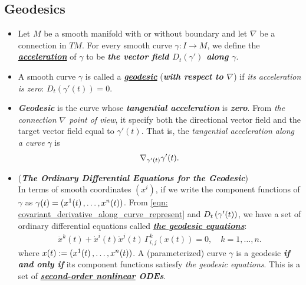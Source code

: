 \documentclass[11pt]{article}
\begin{document}
\subsection{Geodesics}
\begin{itemize}
\item 
\begin{definition}
Let $M$ be a smooth manifold with or without boundary and let $\nabla$ be a connection in $TM$. For every smooth curve $\gamma: I \rightarrow M$, we define the \underline{\emph{\textbf{acceleration}}} of $\gamma$ to be \emph{\textbf{the vector field $D_t(\gamma')$ along $\gamma$}}.
\end{definition}

\item \begin{definition}
A smooth curve $\gamma$ is called a \underline{\emph{\textbf{geodesic}}} (\emph{\textbf{with respect to $\nabla$}}) if \emph{its acceleration is zero}: $D_t(\gamma'(t)) = 0$. 
\end{definition}

\item \begin{remark}
\emph{\textbf{Geodesic}} is the curve whose \emph{\textbf{tangential acceleration}} is \emph{\textbf{zero}}. From \emph{the connection $\nabla$ point of view}, it specify both the directional vector field and the target vector field equal to $\gamma'(t)$. That is, the \emph{tangential acceleration along a curve} $\gamma$ is 
\begin{align*}
\nabla_{\gamma'(t)}{\gamma'(t)}.
\end{align*}
\end{remark}

\item \begin{remark} (\emph{\textbf{The Ordinary Differential Equations for the Geodesic}})\\
In terms of smooth coordinates $(x^i)$, if we write the component functions of $\gamma$ as $\gamma(t) = (x^1(t) \,{,}\ldots{,}\, x^n(t))$. From \eqref{eqn: covariant_derivative_along_curve_represent} and  $D_t\left(\gamma'(t)\right)$, we have a set of ordinary differential equations called \underline{\emph{\textbf{the geodesic equations}}}:
\begin{align}
\ddot{x}^k(t)  + \dot{x}^{i}(t)\dot{x}^j(t)\,\Gamma_{i,j}^{k}(x(t)) = 0, \quad k=1,\ldots, n \label{eqn: geodesic_equation}.
\end{align} where $x(t) := (x^1(t) \,{,}\ldots{,}\, x^n(t))$. A (parameterized) curve $\gamma$ is a geodesic \emph{\textbf{if and only if}} its component functions satiesfy \emph{the geodesic equations}. This is a set of \emph{\textbf{\underline{second-order nonlinear} ODEs}}.
\end{remark}


\end{itemize}
\end{document}
